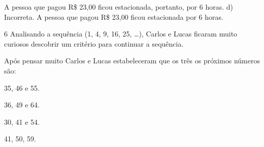 \begin{escolha}
\begin{boxmedio}
\begin{boxmedio}
{\begin{boxpeq}
\begin{boxpeq}
{\begin{boxpeq}
\begin{boxmedio}
\begin{boxmedio}
\begin{boxpeq}
\begin{boxmedio}
\begin{boxpeq}
\begin{boxpeq}
\begin{boxpeq}
\begin{boxpeq}
\begin{boxmedio}
{\begin{boxmedio}
\begin{boxmedio}
\begin{boxpeq}
\begin{boxmedio}
\begin{boxpeq}
\begin{boxpeq}
\begin{boxpeq}
\begin{escolha}
{\begin{boxmedio}
\begin{boxpeq}
\begin{boxpeq}
\begin{boxpeq}
\begin{boxpeq}
\begin{boxpeq}
\begin{boxmedio}
\begin{boxpeq}
\begin{boxpeq}
\begin{boxpeq}
{\begin{boxpeq}
\begin{boxmedio}
\begin{boxpeq}
\begin{boxpeq}
\begin{boxpeq}
{\begin{boxpeq}
\begin{boxmedio}
{\begin{boxpeq}
\begin{boxpeq}
\begin{boxmedio}
\begin{boxmedio}
\begin{boxpeq}
\begin{boxpeq}
{\begin{boxpeq}
\begin{boxpeq}
\begin{boxpeq}
\begin{boxpeq}
\begin{boxpeq}
\begin{escolha}
\begin{escolha}
{\begin{boxmedio}
\begin{boxpeq}
\begin{q°}
\begin{boxmedio}
\begin{boxpeq}
\begin{boxpeq}
\begin{boxmedio}
\begin{boxmedio}
\begin{boxmedio}
\begin{boxmedio}
{A pessoa que pagou R\$ 23,00 ficou estacionada, portanto, por 6 horas.
d) Incorreta. A pessoa que pagou R\$ 23,00 ficou estacionada por 6 horas.}

\num{6} Analisando a sequência (1, 4, 9, 16, 25, \ldots{}), Carlos e Lucas 
ficaram muito curiosos descobrir um critério para continuar a sequência.

Após pensar muito Carlos e Lucas estabeleceram que os três os próximos
números são:

\begin{escolha}

  \item 35, 46 e 55.

  \item 36, 49 e 64.

  \item 30, 41 e 54.

  \item 41, 50, 59.

\end{escolha}

\end{boxmedio}
\end{boxmedio}
\end{boxmedio}
\end{boxmedio}
\end{boxpeq}
\end{boxpeq}
\end{boxmedio}
\end{q°}
\end{boxpeq}
\end{boxmedio}}
\end{escolha}
\end{escolha}
\end{boxpeq}
\end{boxpeq}
\end{boxpeq}
\end{boxpeq}
\end{boxpeq}}
\end{boxpeq}
\end{boxpeq}
\end{boxmedio}
\end{boxmedio}
\end{boxpeq}
\end{boxpeq}}
\end{boxmedio}
\end{boxpeq}}
\end{boxpeq}
\end{boxpeq}
\end{boxpeq}
\end{boxmedio}
\end{boxpeq}}
\end{boxpeq}
\end{boxpeq}
\end{boxpeq}
\end{boxmedio}
\end{boxpeq}
\end{boxpeq}
\end{boxpeq}
\end{boxpeq}
\end{boxpeq}
\end{boxmedio}}
\end{escolha}
\end{boxpeq}
\end{boxpeq}
\end{boxpeq}
\end{boxmedio}
\end{boxpeq}
\end{boxmedio}
\end{boxmedio}}
\end{boxmedio}
\end{boxpeq}
\end{boxpeq}
\end{boxpeq}
\end{boxpeq}
\end{boxmedio}
\end{boxpeq}
\end{boxmedio}
\end{boxmedio}
\end{boxpeq}}
\end{boxpeq}
\end{boxpeq}}
\end{boxmedio}
\end{boxmedio}
\end{escolha}
